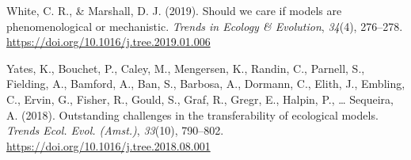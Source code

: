 \documentclass[
]{article}
\newlength{\cslhangindent}
\newenvironment{CSLReferences}[2] %
 {\begin{list}{}{%
  \setlength{\itemindent}{0pt}
  \setlength{\leftmargin}{0pt}
  \setlength{\parsep}{0pt}
  \ifodd #1
   \setlength{\leftmargin}{\cslhangindent}
   \setlength{\itemindent}{-1\cslhangindent}
  \fi
  \setlength{\itemsep}{#2\baselineskip}}}
 {\end{list}}
\begin{document}
\begin{CSLReferences}{1}{0}
White, C. R., \& Marshall, D. J. (2019). Should we care if models are
phenomenological or mechanistic. \emph{Trends in Ecology \& Evolution},
\emph{34}(4), 276--278. \url{https://doi.org/10.1016/j.tree.2019.01.006}

Yates, K., Bouchet, P., Caley, M., Mengersen, K., Randin, C., Parnell,
S., Fielding, A., Bamford, A., Ban, S., Barbosa, A., Dormann, C., Elith,
J., Embling, C., Ervin, G., Fisher, R., Gould, S., Graf, R., Gregr, E.,
Halpin, P., \ldots{} Sequeira, A. (2018). Outstanding challenges in the
transferability of ecological models. \emph{Trends Ecol. Evol. (Amst.)},
\emph{33}(10), 790--802.
\url{https://doi.org/10.1016/j.tree.2018.08.001}

\end{CSLReferences}
\end{document}
